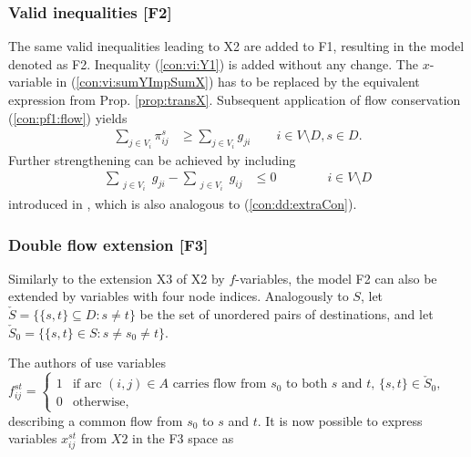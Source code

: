 \subsubsection{Valid inequalities [F2]}

The same valid inequalities  leading to X2 are added to F1, resulting in the model denoted as F2.
Inequality (\ref{con:vi:Y1}) is added without any change.
The $x$-variable in (\ref{con:vi:sumYImpSumX}) has to be replaced by the equivalent expression from Prop. \ref{prop:transX}. 
Subsequent application of flow conservation (\ref{con:pf1:flow}) yields
\begin{subequations}[resume]
\begin{flalign}
\label{con:vi:sumYImpSumXTrans} \sum\limits_{j\in V_i }\pi^{s}_{ij} & \geq \sum\limits_{j\in V_i}  g_{ji}  \quad\quad   i\in V\setminus D, s\in D. 
\end{flalign}
\end{subequations}
%
Further strengthening can be achieved by including 
\begin{subequations}[resume]
\begin{flalign}
\label{con:pf1:flowX}  \sum\limits_{\substack{ j\in V_i }}g_{ji}-\sum\limits_{\substack{j\in V_i}}g_{ij}    & \leq 0    \qquad\qquad			  i\in V\setminus D 
\end{flalign}
\end{subequations}
introduced in \cite{Polzin}, which is also analogous to (\ref{con:dd:extraCon}).

\subsubsection{Double flow extension [F3]}

Similarly to the extension X3 of X2 by $f$-variables, the model F2 can also be extended by variables with four node indices.
Analogously to $S$, let $\check{S}=\{\{s,t\}\subseteq D: s\neq t\}$ be the set of unordered pairs of destinations, and let $\check{S}_0=\{\{s,t\}\in S: s\neq s_0\neq t\}$.
 
The authors of \cite{Polzin} use variables
\newline\newline
$f^{st}_{ij}=
\begin{cases}
    1 & \text{if arc $(i,j) \in A$ carries flow from $s_0$ to both $s$ and $t$, $\{s,t\}\in \check{S}_0$},\\
    0 & \text{otherwise},
\end{cases}$
\newline\newline
describing a common flow from $s_0$ to $s$ and $t$.
It is now possible to express variables $x^{st}_{ij}$ from $X2$ in the F3 space as 

